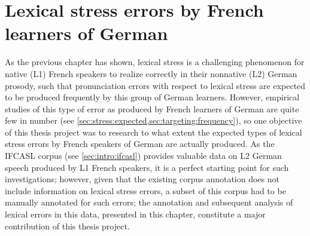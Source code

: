 
%
%
\chapter{Lexical stress errors by French learners of German}
\label{chap:lexstress}



%	
	

	
	As the previous chapter has shown, lexical stress is a challenging phenomenon for native (L1) French speakers to realize correctly in their nonnative (L2) German prosody, such that pronunciation errors with respect to lexical stress are expected to be produced frequently by this group of German learners.
%
	However, empirical studies of this type of error as produced by French learners of German are quite few in number (see \cref{sec:stress:expected,sec:targeting:frequency}), so one objective of this thesis project was to research to what extent the expected types of lexical stress errors by French speakers of German are actually produced.
	 As the IFCASL corpus (see \cref{sec:intro:ifcasl}) provides valuable data on L2 German speech produced by L1 French speakers, it is a perfect starting point for such investigations; however, given that the existing corpus annotation does not include information on lexical stress errors,
	  a subset of this corpus had to be manually annotated for such errors; the annotation and subsequent analysis of lexical errors in this data, presented in this chapter, constitute a major contribution of this thesis project.
%
	
